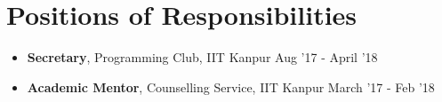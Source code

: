 \newcommand{\por}[3]{\textbf{#1}, #2 \hfill #3}

\section*{Positions of Responsibilities}
\begin{itemize}

\setlength\itemsep{0pt}
\item \por{Secretary}{Programming Club, IIT Kanpur}{Aug '17 - April '18}
\item \por{Academic Mentor}{Counselling Service, IIT Kanpur}{March '17 - Feb '18}

\end{itemize}
